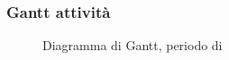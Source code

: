 \subsubsection{Gantt attività}
\begin{figure}[H]
\centering
{}
\caption{Diagramma di Gantt, periodo di \AR{}}
\end{figure}

